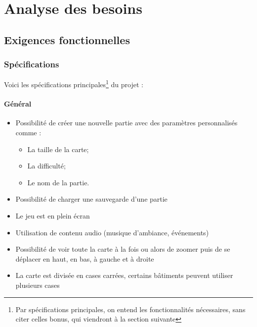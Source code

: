 \documentclass[a4paper,10pt,openany,oneside]{report}
\begin{document}
\chapter{Analyse des besoins}
\thispagestyle{headings}
\section{Exigences fonctionnelles}
\subsection{Spécifications}
Voici les spécifications principales\footnote{Par spécifications principales, on entend les fonctionnalités nécessaires, sans citer celles bonus, qui viendront à la section suivante} du projet :
\subsubsection{Général}
\begin{itemize}
\item Possibilité de créer une nouvelle partie avec des paramètres personnalisés comme :
\begin{itemize}
\item La taille de la carte;
\item La difficulté;
\item Le nom de la partie.
\end{itemize}
\item Possibilité de charger une sauvegarde d'une partie
\item Le jeu est en plein écran
\item Utilisation de contenu audio (musique d'ambiance, événements)
\item Possibilité de voir toute la carte à la fois ou alors de zoomer puis de se déplacer en haut, en bas, à gauche et à droite
\item La carte est divisée en cases carrées, certains bâtiments peuvent utiliser plusieurs cases
\end{itemize}
\end{document}
